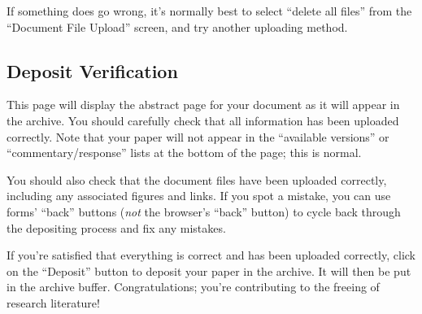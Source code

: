 If something does go wrong, it's normally best to select ``delete all files'' from the ``Document File Upload'' screen, and try another uploading method.


\subsection{Deposit Verification}

This page will display the abstract page for your document as it will appear in the archive. You should carefully check that all information has been uploaded correctly. Note that your paper will not appear in the ``available versions'' or ``commentary/response'' lists at the bottom of the page; this is normal.

You should also check that the document files have been uploaded correctly, including any associated figures and links. If you spot a mistake, you can use forms' ``back'' buttons (\emph{not} the browser's ``back'' button) to cycle back through the depositing process and fix any mistakes.

If you're satisfied that everything is correct and has been uploaded correctly, click on the ``Deposit'' button to deposit your paper in the archive. It will then be put in the archive buffer. Congratulations; you're contributing to the freeing of research literature!
